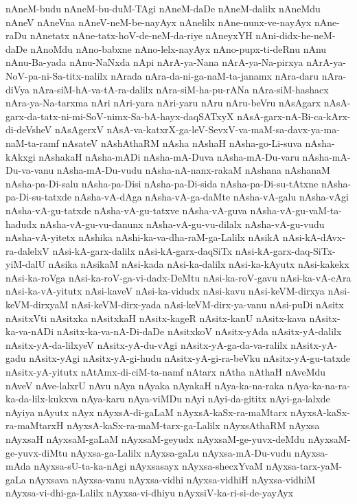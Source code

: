 {nAneM-budu
nAneM-bu-duM-TAgi
nAneM-daDe
nAneM-dalilx
nAneMdu
nAneV
nAneVna
nAneV-neM-be-nayAyx
nAnelilx
nAne-nunx-ve-nayAyx
nAne-raDu
nAnetatx
nAne-tatx-hoV-de-neM-da-riye
nAneyxYH
nAni-didx-he-neM-daDe
nAnoMdu
nAno-babxne
nAno-lelx-nayAyx
nAno-pupx-ti-deRnu
nAnu
nAnu-Ba-yada
nAnu-NaNxda
nApi
nArA-ya-Nana
nArA-ya-Na-pirxya
nArA-ya-NoV-pa-ni-Sa-titx-nalilx
nArada
nAra-da-ni-ga-naM-ta-janamx
nAra-daru
nAra-diVya
nAra-siM-hA-va-tA-ra-dalilx
nAra-siM-ha-pu-rANa
nAra-siM-hashacx
nAra-ya-Na-tarxma
nAri
nAri-yara
nAri-yaru
nAru
nAru-beVru
nAsAgarx
nAsA-garx-da-tatx-ni-mi-SoV-nimx-Sa-bA-hayx-daqSATxyX
nAsA-garx-nA-Bi-ca-kArx-di-deVsheV
nAsAgerxV
nAsA-va-katxrX-ga-leV-SevxV-va-maM-sa-davx-ya-ma-naM-ta-ramf
nAsateV
nAshAthaRM
nAsha
nAshaH
nAsha-go-Li-suva
nAsha-kAkxgi
nAshakaH
nAsha-mADi
nAsha-mA-Duva
nAsha-mA-Du-varu
nAsha-mA-Du-va-vanu
nAsha-mA-Du-vudu
nAsha-nA-nanx-rakaM
nAshana
nAshanaM
nAsha-pa-Di-salu
nAsha-pa-Disi
nAsha-pa-Di-sida
nAsha-pa-Di-su-tAtxne
nAsha-pa-Di-su-tatxde
nAsha-vA-dAga
nAsha-vA-ga-daMte
nAsha-vA-galu
nAsha-vAgi
nAsha-vA-gu-tatxde
nAsha-vA-gu-tatxve
nAsha-vA-guva
nAsha-vA-gu-vaM-ta-hadudx
nAsha-vA-gu-vu-danunx
nAsha-vA-gu-vu-dilalx
nAsha-vA-gu-vudu
nAsha-vA-yitetx
nAshika
nAshi-ka-va-dha-raM-ga-Lalilx
nAsikA
nAsi-kA-dAvx-ra-dalelxV
nAsi-kA-garx-dalilx
nAsi-kA-garx-daqSiTx
nAsi-kA-garx-daq-SiTx-yiM-dalU
nAsika
nAsikaM
nAsi-kada
nAsi-ka-dalilx
nAsi-ka-kAyutx
nAsi-kakekx
nAsi-ka-roVga
nAsi-ka-roV-ga-vi-dadx-DeMtu
nAsi-ka-roV-gavu
nAsi-ka-vA-cAra
nAsi-ka-vA-yitutx
nAsi-kaveV
nAsi-ka-vidudx
nAsi-kavu
nAsi-keVM-dirxya
nAsi-keVM-dirxyaM
nAsi-keVM-dirx-yada
nAsi-keVM-dirx-ya-vanu
nAsi-puDi
nAsitx
nAsitxVti
nAsitxka
nAsitxkaH
nAsitx-kageR
nAsitx-kanU
nAsitx-kava
nAsitx-ka-va-nADi
nAsitx-ka-va-nA-Di-daDe
nAsitxkoV
nAsitx-yAda
nAsitx-yA-dalilx
nAsitx-yA-da-lilxyeV
nAsitx-yA-du-vAgi
nAsitx-yA-ga-da-va-ralilx
nAsitx-yA-gadu
nAsitx-yAgi
nAsitx-yA-gi-hudu
nAsitx-yA-gi-ra-beVku
nAsitx-yA-gu-tatxde
nAsitx-yA-yitutx
nAtAmx-di-ciM-ta-namf
nAtarx
nAtha
nAthaH
nAveMdu
nAveV
nAve-lalxrU
nAvu
nAya
nAyaka
nAyakaH
nAya-ka-na-raka
nAya-ka-na-ra-ka-da-lilx-kukxva
nAya-karu
nAya-viMDu
nAyi
nAyi-da-gititx
nAyi-ga-lalxde
nAyiya
nAyutx
nAyx
nAyxsA-di-gaLaM
nAyxsA-kaSx-ra-maMtarx
nAyxsA-kaSx-ra-maMtarxH
nAyxsA-kaSx-ra-maM-tarx-ga-Lalilx
nAyxsAthaRM
nAyxsa
nAyxsaH
nAyxsaM-gaLaM
nAyxsaM-geyudx
nAyxsaM-ge-yuvx-deMdu
nAyxsaM-ge-yuvx-diMtu
nAyxsa-ga-Lalilx
nAyxsa-gaLu
nAyxsa-mA-Du-vudu
nAyxsa-mAda
nAyxsa-sU-ta-ka-nAgi
nAyxsasayx
nAyxsa-shecxYvaM
nAyxsa-tarx-yaM-gaLa
nAyxsava
nAyxsa-vanu
nAyxsa-vidhi
nAyxsa-vidhiH
nAyxsa-vidhiM
nAyxsa-vi-dhi-ga-Lalilx
nAyxsa-vi-dhiyu
nAyxsiV-ka-ri-si-de-yayAyx
}
